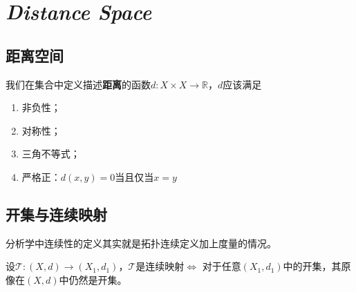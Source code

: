 \chapter{\textsl{Distance Space}}

\section{距离空间}

我们在集合中定义描述\textbf{距离}的函数$d:X\times X\rightarrow \mathbb{R}$，$d$应该满足
\begin{enumerate}[itemindent=2em]
    \item 非负性；
    \item 对称性；
    \item 三角不等式；
    \item 严格正：$d(x,y)=0$当且仅当$x=y$
\end{enumerate}

\section{开集与连续映射}

分析学中连续性的定义其实就是拓扑连续定义加上度量的情况。

\begin{mdframed}
    \begin{theorem}
        设$\mathcal{T}:(X,d)\rightarrow (X_1,d_1)$，$\mathcal{T}$是连续映射$\Longleftrightarrow$ 对于任意$(X_1,d_1)$中的开集，其原像在$(X,d)$中仍然是开集。
    \end{theorem}
\end{mdframed}

